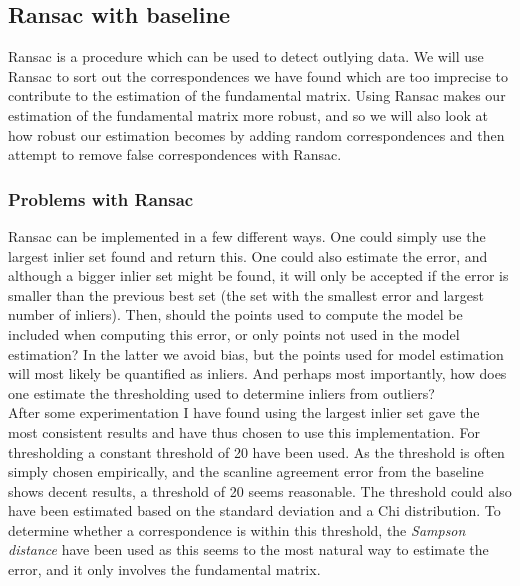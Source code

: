 \subsection{Ransac with baseline}
Ransac is a procedure which can be used to detect outlying data. We will use Ransac to sort out the correspondences we have found which are too imprecise to contribute to the estimation of the fundamental matrix. Using Ransac makes our estimation of the fundamental matrix more robust, and so we will also look at how robust our estimation becomes by adding random correspondences and then attempt to remove false correspondences with Ransac.

\subsubsection{Problems with Ransac}
Ransac can be implemented in a few different ways. One could simply use the largest inlier set found and return this. One could also estimate the error, and although a bigger inlier set might be found, it will only be accepted if the error is smaller than the previous best set (the set with the smallest error and largest number of inliers). Then, should the points used to compute the model be included when computing this error, or only points not used in the model estimation? In the latter we avoid bias, but the points used for model estimation will most likely be quantified as inliers. And perhaps most importantly, how does one estimate the thresholding used to determine inliers from outliers?\\
After some experimentation I have found using the largest inlier set gave the most consistent results and have thus chosen to use this implementation. For thresholding a constant threshold of 20 have been used. As the threshold is often simply chosen empirically, and the scanline agreement error from the baseline shows decent results, a threshold of 20 seems reasonable. The threshold could also have been estimated based on the standard deviation and a Chi distribution. To determine whether a correspondence is within this threshold, the \textit{Sampson distance} have been used as this seems to the most natural way to estimate the error, and it only involves the fundamental matrix.

